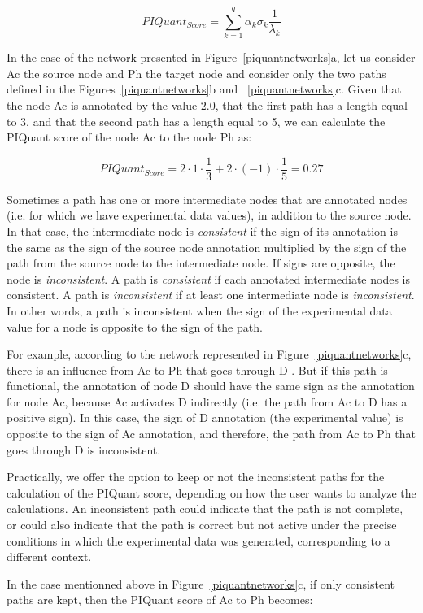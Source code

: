 \documentclass[10pt]{bmc_article}
\newenvironment{bmcformat}{\baselineskip20pt\sloppy\setboolean{publ}{false}}{\baselineskip20pt\sloppy}
\begin{document}
\begin{bmcformat}
$$
 PIQuant_{Score} = \sum_{k=1}^{q} \alpha_{k} \sigma_{k} \frac{1}{\lambda_{k}}
$$

In the case of the network presented in Figure~\ref{piquantnetworks}a, let us
consider Ac the source node and Ph the target node and consider only the two
paths defined in the Figures~\ref{piquantnetworks}b and
~\ref{piquantnetworks}c. Given that the
node Ac is annotated by the value $2.0$, that the first path has a length
equal to 3, and that the second path has a length equal to 5, we can calculate the PIQuant score
of the node Ac to the node Ph as:

$$
 PIQuant_{Score} = 2 \cdot 1 \cdot \frac{1}{3} + 2 \cdot (-1) \cdot \frac{1}{5}
= 0.27
$$


Sometimes a path has one or more intermediate nodes that are annotated nodes
(i.e. for which we have experimental data values),
in addition to the source node.
In that case, the intermediate node is \textit{consistent} if the sign of its
annotation is the same as the sign of the source node annotation multiplied by
the sign of the
path from the source node to the intermediate node. If signs are opposite, the
node is \textit{inconsistent}.
A path is \textit{consistent} if each annotated intermediate nodes is
consistent. A path is \textit{inconsistent} if at least one intermediate node is
\textit{inconsistent}.
In other words, a path is inconsistent when the
sign of the experimental data value for a node is opposite to the sign
of the path.

For example, according to the network represented in Figure~\ref{piquantnetworks}c, there is an influence from Ac to Ph
that goes through D . But if this path
is functional, the annotation of node D should have the same sign as the annotation for node Ac, because
Ac activates D indirectly (i.e. the path from Ac to D has a positive sign). In this case, the sign of D annotation (the experimental value) is opposite to
the sign of Ac annotation, and therefore, the path from Ac to Ph that goes through D is inconsistent.

Practically, we offer the option to
keep or not the inconsistent paths for the calculation of the PIQuant score,
depending on how the user wants to analyze the calculations. An inconsistent
path could indicate that the path is not complete, or could also indicate that
the path is correct but not active under the precise conditions in which the
experimental data was generated, corresponding to a different context.

In the case mentionned above in Figure~\ref{piquantnetworks}c, if only consistent paths are kept, then the PIQuant score of Ac to Ph
becomes:


\end{bmcformat}
\end{document}
